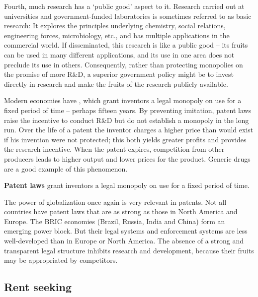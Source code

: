 Fourth, much research has a `public good' aspect to it. Research carried 
out at universities and government-funded laboratories is sometimes 
referred to as basic research: It explores the principles underlying 
chemistry, social relations, engineering forces, microbiology, etc., and 
has multiple applications in the commercial world. If disseminated, this 
research is like a public good -- its fruits can be used in many different 
applications, and its use in one area does not preclude its use in others. 
Consequently, rather than protecting monopolies on the promise of more R\&D, 
a superior government policy might be to invest directly in research and 
make the fruits of the research publicly available.

\newhtmlpage

Modern economies have , which grant inventors a 
legal monopoly on use for a fixed period of time -- perhaps fifteen years. 
By preventing imitation, patent laws raise the incentive to conduct R\&D 
but do not establish a monopoly in the long run. Over the life of a patent 
the inventor charges a higher price than would exist if his invention were 
not protected; this both yields greater profits and provides the research 
incentive. When the patent expires, competition from other producers leads 
to higher output and lower prices for the product. Generic drugs are a good 
example of this phenomenon. 

\begin{DefBox}
\textbf{Patent laws} grant inventors a legal monopoly on use for a fixed period of time.
\end{DefBox}

The power of globalization once again is very relevant in patents. Not all 
countries have patent laws that are as strong as those in North America and 
Europe. The BRIC economies (Brazil, Russia, India and China) form an emerging 
power block. But their legal systems and enforcement systems are less 
well-developed than in Europe or North America. The absence of a strong and 
transparent legal structure inhibits research and development, because their 
fruits may be appropriated by competitors.

\newhtmlpage

\subsection*{Rent seeking}

